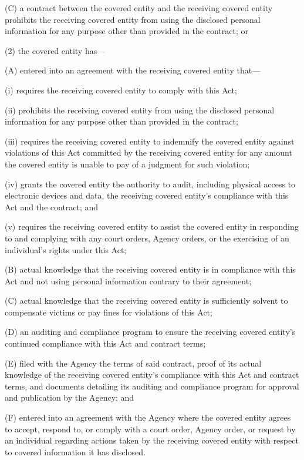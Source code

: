 (C) a contract between the covered entity and the receiving covered entity prohibits the receiving covered entity from using the disclosed personal information for any purpose other than provided in the contract; or

(2) the covered entity has—

(A) entered into an agreement with the receiving covered entity that—

(i) requires the receiving covered entity to comply with this Act;

(ii) prohibits the receiving covered entity from using the disclosed personal information for any purpose other than provided in the contract;

(iii) requires the receiving covered entity to indemnify the covered entity against violations of this Act committed by the receiving covered entity for any amount the covered entity is unable to pay of a judgment for such violation;

(iv) grants the covered entity the authority to audit, including physical access to electronic devices and data, the receiving covered entity’s compliance with this Act and the contract; and

(v) requires the receiving covered entity to assist the covered entity in responding to and complying with any court orders, Agency orders, or the exercising of an individual’s rights under this Act;

(B) actual knowledge that the receiving covered entity is in compliance with this Act and not using personal information contrary to their agreement;

(C) actual knowledge that the receiving covered entity is sufficiently solvent to compensate victims or pay fines for violations of this Act;

(D) an auditing and compliance program to ensure the receiving covered entity’s continued compliance with this Act and contract terms;

(E) filed with the Agency the terms of said contract, proof of its actual knowledge of the receiving covered entity’s compliance with this Act and contract terms, and documents detailing its auditing and compliance program for approval and publication by the Agency; and

(F) entered into an agreement with the Agency where the covered entity agrees to accept, respond to, or comply with a court order, Agency order, or request by an individual regarding actions taken by the receiving covered entity with respect to covered information it has disclosed.

